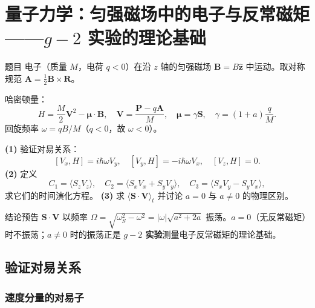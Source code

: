 \section{量子力学：匀强磁场中的电子与反常磁矩——$g-2$ 实验的理论基础}

\begin{modelbox}{题目}
电子（质量 $M$，电荷 $q<0$）在沿 $z$ 轴的匀强磁场 $\bm B=B\hat{\bm z}$ 中运动。取对称规范 $\bm A=\frac12\bm B\times\bm R$。

哈密顿量：
\[
  H = \frac{M}{2}\bm V^2 - \bm\mu\cdot\bm B,
  \quad \bm V = \frac{\bm P-q\bm A}{M},
  \quad \bm\mu = \gamma\bm S,
  \quad \gamma = (1+a)\frac{q}{M}.
\]
回旋频率 $\omega = qB/M$（$q<0$，故 $\omega<0$）。

\textbf{(1)} 验证对易关系：
\[
  [V_x,H]=i\hbar\omega V_y,\quad [V_y,H]=-i\hbar\omega V_x,\quad [V_z,H]=0.
\]
\textbf{(2)} 定义
\[
  C_1=\langle S_zV_z\rangle,\quad
  C_2=\langle S_xV_x+S_yV_y\rangle,\quad
  C_3=\langle S_xV_y-S_yV_x\rangle,
\]
求它们的时间演化方程。
\textbf{(3)} 求 $\langle\bm S\cdot\bm V\rangle_t$ 并讨论 $a=0$ 与 $a\neq 0$ 的物理区别。
\end{modelbox}

\vspace{0.3em}
\begin{insightbox}{结论预告}
$\bm S\cdot\bm V$ 以频率 $\Omega=\sqrt{\omega_S^2-\omega^2}=|\omega|\sqrt{a^2+2a}$ 振荡。$a=0$（无反常磁矩）时不振荡；$a\neq 0$ 时的振荡正是 \textbf{$g-2$ 实验}测量电子反常磁矩的理论基础。
\end{insightbox}


\subsection{验证对易关系}

\subsubsection{速度分量的对易子}

